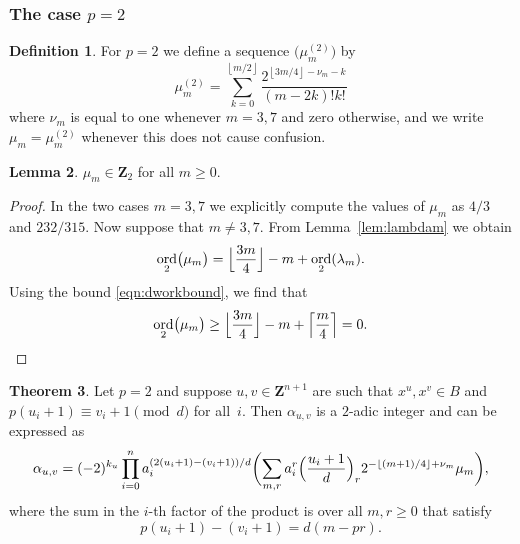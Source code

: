 \documentclass[a4paper,11pt]{article}
\numberwithin{equation}{section}
\providecommand{\floor}[1]{\left\lfloor#1\right\rfloor}   %
\providecommand{\floorBig}[1]{\Bigl\lfloor#1\Bigr\rfloor} %
\providecommand{\ceil}[1]{\left\lceil#1\right\rceil}   %
\newcommand{\ZZ}{\mathbf{Z}} %
\DeclareMathOperator{\ord}{ord}          %
\theoremstyle{definition}
\newtheorem{thm}{Theorem}[section]
\newtheorem{lem}[thm]{Lemma}
\newtheorem{defn}[thm]{Definition}
\begin{document}
\subsubsection{The case $p = 2$}

\begin{defn} \label{defn:mu2}
For $p = 2$ we define a sequence $\bigl(\mu_m^{(2)}\bigr)$ by 
\begin{equation*}
\mu_m^{(2)} = 
    \sum_{k=0}^{\floor{m/2}} \frac{2^{\floor{3m/4} - \nu_m - k}}{(m-2k)! k!}
\end{equation*}
where $\nu_m$ is equal to one whenever $m = 3, 7$ and zero otherwise, 
and we write $\mu_m =\mu_m^{(2)}$ whenever this does not cause confusion. 
\end{defn}

\begin{lem} \label{lem:mu2}
$\mu_m \in \ZZ_2$ for all $m \geq 0$.
\end{lem}

\begin{proof}
In the two cases $m = 3, 7$ we explicitly compute the values of 
$\mu_m$ as $4/3$ and $232/315$.  Now suppose that $m \neq 3, 7$. 
From Lemma~\ref{lem:lambdam} we obtain 
\begin{equation*}
\ord_2 \bigl(\mu_m\bigr) 
    = \floorBig{\frac{3m}{4}} - m + \ord_2(\lambda_m).
\end{equation*}
Using the bound \eqref{eqn:dworkbound}, we find that 
\begin{equation*}
\ord_2 \bigl(\mu_m\bigr) 
    \geq \floorBig{\frac{3m}{4}} - m + \ceil{\frac{m}{4}} = 0. \qedhere
\end{equation*}
\end{proof}

\begin{thm} \label{thm:alpha2}
Let $p = 2$ and suppose $u, v \in \ZZ^{n+1}$ are such that 
$x^u, x^v \in B$ and $p (u_i + 1) \equiv v_i + 1 \pmod{d}$ 
for all~$i$.  Then $\alpha_{u,v}$ is a $2$-adic integer and can be expressed as 
\begin{equation*}
\alpha_{u,v} = (-2)^{k_u} \prod_{i=0}^n a_i^{(2 (u_i + 1) - (v_i + 1))/d} \biggl( \sum_{m,r} a_i^{r} \Bigl(\frac{u_i+1}{d}\Bigr)_r 2^{-\floor{(m+1)/4}+\nu_m} \mu_m \biggr), 
\end{equation*}
where the sum in the $i$-th factor of the product is over all $m, r \geq 0$  
that satisfy
\[
p(u_i+1)-(v_i+1)=d(m-pr).
\]
\end{thm}
\end{document}
